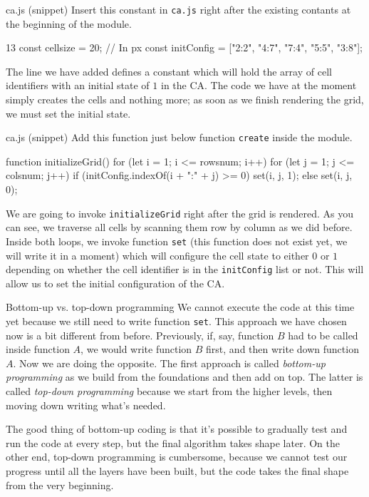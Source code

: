 \begin{programcode}{ca.js (snippet)}
Insert this constant in \texttt{ca.js} right after the existing contants at the beginning of the module.
\begin{codeh1}{1}{3}
const cellsize = 20; // In px
const initConfig = ["2:2", "4:7", "7:4", "5:5", "3:8"];
\end{codeh1}
\end{programcode}

The line we have added defines a constant which will hold the array of cell identifiers with an initial state
of $1$ in the CA. The code we have at the moment simply creates the cells and nothing more;
as soon as we finish rendering the grid, we must set the initial state.

\begin{programcode}{ca.js (snippet)}
Add this function just below function \texttt{create} inside the module.
\begin{code}
function initializeGrid() {
  for (let i = 1; i <= rowsnum; i++) {
    for (let j = 1; j <= colsnum; j++) {
      if (initConfig.indexOf(i + ":" + j) >= 0) {
        set(i, j, 1);
      } else {
        set(i, j, 0);
      }
    }
  }
}
\end{code}
\end{programcode}

We are going to invoke \texttt{initializeGrid} right after the grid is rendered. As you can see, we traverse
all cells by scanning them row by column as we did before. Inside both loops, we invoke function \texttt{set}
(this function does not exist yet, we will write it in a moment) which will configure the cell state to either
$0$ or $1$ depending on whether the cell identifier is in the \texttt{initConfig} list or not. This will allow us
to set the initial configuration of the CA.

\begin{important}{Bottom-up vs. top-down programming}
We cannot execute the code at this time yet because we still need to write function \texttt{set}.
This approach we have chosen now is a bit different from before. Previously, if, say, function $B$ had to
be called inside function $A$, we would write function $B$ first, and then write down function $A$. Now we are
doing the opposite. The first approach is called \textit{bottom-up programming}
as we build from the foundations and then add on top.
The latter is called \textit{top-down programming} because we start from the higher levels, then moving down
writing what's needed.

The good thing of bottom-up coding is that it's possible to gradually test and run the code at 
every step, but the final algorithm takes
shape later. On the other end, top-down programming is cumbersome, because we cannot test our progress until
all the layers have been built, but the code takes the final shape from the very beginning.
\end{important}

